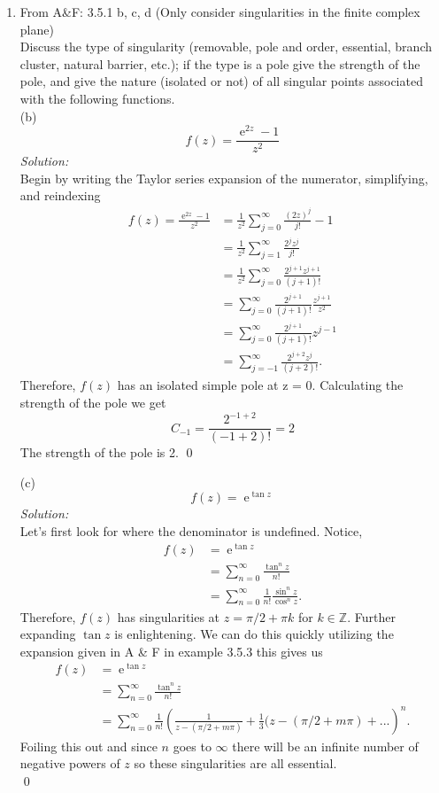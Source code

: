 \documentclass[10pt]{amsart}
\DeclareMathOperator{\E}{e}
\theoremstyle{nonumberplain}
\begin{document}
\mline
\begin{enumerate}[label={\bf {\arabic*}:}]
\item  From A\&F: 3.5.1 b, c, d (Only consider singularities in the finite
  complex plane) \\
Discuss the type of singularity (removable, pole and order, essential, branch cluster, natural barrier, etc.); if the type is a pole give the strength of the pole,  and give the nature (isolated or not) of all singular points associated with the following functions. \\

\noindent
(b)
$$
f(z) = \frac {\E^{2z} - 1} {z^2}
$$
\textit{Solution:} \\
Begin by writing the Taylor series expansion of the numerator, simplifying, and reindexing
\begin{align*}
f(z) = \frac {\E^{2z} - 1} {z^2} &= \frac 1 {z^2} \sum_{j=0}^\infty \frac{(2z)^j} {j!} - 1 \\
	&= \frac 1 {z^2} \sum_{j=1}^\infty \frac{2^jz^j} {j!} \\
	&= \frac 1 {z^2} \sum_{j=0}^\infty \frac{2^{j + 1}z^{j + 1}} {(j + 1)!} \\
	&= \sum_{j=0}^\infty \frac{2^{j + 1}} {(j + 1)!} \frac {z^{j + 1}}{z^2} \\
	&= \sum_{j=0}^\infty \frac{2^{j + 1}} {(j + 1)!} z^{j - 1} \\
	&= \sum_{j=-1}^\infty \frac{2^{j + 2}z^j} {(j + 2)!}.
\end{align*}
Therefore, $f(z)$ has an isolated simple pole at z = 0.
Calculating the strength of the pole we get
$$C_{-1} = \frac{2^{-1 + 2}} {(-1 + 2)!} = 2$$
The strength of the pole is 2.
\qed \\
\newpage

\noindent
(c)
$$
f(z) = \E^{\tan z}
$$
\textit{Solution:} \\
Let's first look for where the denominator is undefined.
Notice,
\begin{align*}
f(z) &= \E^{\tan z} \\
	&= \sum_{n=0}^\infty \frac {\tan^n z} {n!} \\
	&= \sum_{n=0}^\infty \frac 1 {n!} \frac {\sin^n z} {\cos^n z}.
\end{align*}
Therefore, $f(z)$ has singularities at $z = \pi/2 + \pi k$ for $k \in \mathbb Z$.
Further expanding $\tan z$ is enlightening.
We can do this quickly utilizing the expansion given in A \& F in example 3.5.3 this gives us
\begin{align*}
f(z) &= \E^{\tan z} \\
	&= \sum_{n=0}^\infty \frac {\tan^n z} {n!} \\
	&= \sum_{n=0}^\infty \frac 1 {n!} \left( \frac 1 {z - (\pi/2 + m\pi)} + \frac 1 3 (z - (\pi/2 + m \pi) + ...\right)^n.
\end{align*}
Foiling this out and since $n$ goes to $\infty$ there will be an infinite number of negative powers of $z$ so these singularities are all essential. \\
\qed \\


\end{enumerate}
\end{document}
